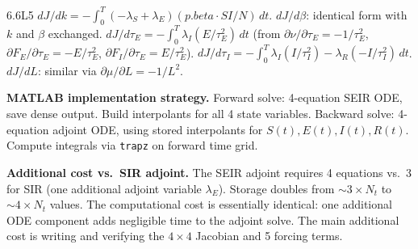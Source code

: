 \begin{solution}{6.6}{L5}
$dJ/dk = -\int_0^T (-\lambda_S + \lambda_E)(p.beta\cdot SI/N)\,dt$.
$dJ/d\beta$: identical form with $k$ and $\beta$ exchanged.
$dJ/d\tau_E = -\int_0^T \lambda_I(E/\tau_E^2)\,dt$ (from $\partial\nu/\partial\tau_E = -1/\tau_E^2$, $\partial F_E/\partial\tau_E = -E/\tau_E^2$, $\partial F_I/\partial\tau_E = E/\tau_E^2$).
$dJ/d\tau_I = -\int_0^T \lambda_I(I/\tau_I^2) - \lambda_R(-I/\tau_I^2)\,dt$.
$dJ/dL$: similar via $\partial\mu/\partial L = -1/L^2$.

 \textbf{MATLAB implementation strategy.}
Forward solve: 4-equation SEIR ODE, save dense output. Build interpolants
for all 4 state variables. Backward solve: 4-equation adjoint ODE,
using stored interpolants for $S(t),E(t),I(t),R(t)$. Compute integrals
via \texttt{trapz} on forward time grid.

 \textbf{Additional cost vs.\ SIR adjoint.}
The SEIR adjoint requires 4 equations vs.\ 3 for SIR (one additional
adjoint variable $\lambda_E$). Storage doubles from $\sim3\times N_t$
to $\sim4\times N_t$ values. The computational cost is essentially
identical: one additional ODE component adds negligible time to the
adjoint solve. The main additional cost is writing and verifying the
$4\times4$ Jacobian and 5 forcing terms.


\end{solution}

